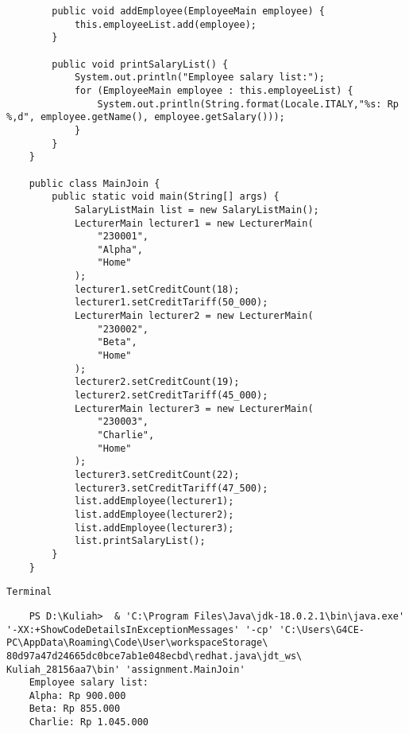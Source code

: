 \documentclass[12pt,titlepage]{article}
\begin{document}
\begin{verbatim}
        public void addEmployee(EmployeeMain employee) {
            this.employeeList.add(employee);
        }

        public void printSalaryList() {
            System.out.println("Employee salary list:");
            for (EmployeeMain employee : this.employeeList) {
                System.out.println(String.format(Locale.ITALY,"%s: Rp %,d", employee.getName(), employee.getSalary()));
            }
        }
    }

    public class MainJoin {
        public static void main(String[] args) {
            SalaryListMain list = new SalaryListMain();
            LecturerMain lecturer1 = new LecturerMain(
                "230001",
                "Alpha",
                "Home"
            );
            lecturer1.setCreditCount(18);
            lecturer1.setCreditTariff(50_000);
            LecturerMain lecturer2 = new LecturerMain(
                "230002",
                "Beta",
                "Home"
            );
            lecturer2.setCreditCount(19);
            lecturer2.setCreditTariff(45_000);
            LecturerMain lecturer3 = new LecturerMain(
                "230003",
                "Charlie",
                "Home"
            );
            lecturer3.setCreditCount(22);
            lecturer3.setCreditTariff(47_500);
            list.addEmployee(lecturer1);
            list.addEmployee(lecturer2);
            list.addEmployee(lecturer3);
            list.printSalaryList();
        }
    }
\end{verbatim}
\texttt{Terminal}
\begin{verbatim}
    PS D:\Kuliah>  & 'C:\Program Files\Java\jdk-18.0.2.1\bin\java.exe' '-XX:+ShowCodeDetailsInExceptionMessages' '-cp' 'C:\Users\G4CE-PC\AppData\Roaming\Code\User\workspaceStorage\ 80d97a47d24665dc0bce7ab1e048ecbd\redhat.java\jdt_ws\ Kuliah_28156aa7\bin' 'assignment.MainJoin'
    Employee salary list:
    Alpha: Rp 900.000    
    Beta: Rp 855.000     
    Charlie: Rp 1.045.000
\end{verbatim}
\end{document}
